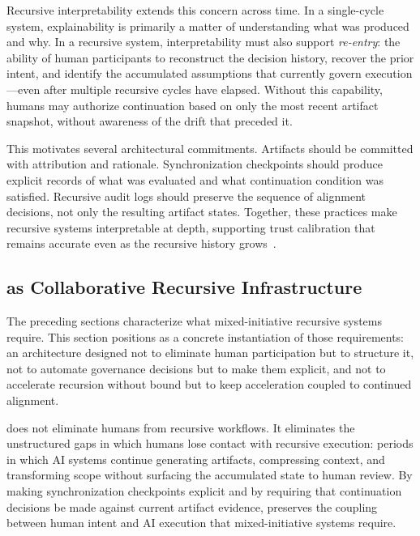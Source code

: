 Recursive interpretability extends this concern across time. In a single-cycle system, explainability is primarily a matter of understanding what was produced and why. In a recursive system, interpretability must also support \textit{re-entry}: the ability of human participants to reconstruct the decision history, recover the prior intent, and identify the accumulated assumptions that currently govern execution---even after multiple recursive cycles have elapsed. Without this capability, humans may authorize continuation based on only the most recent artifact snapshot, without awareness of the drift that preceded it.

This motivates several architectural commitments. Artifacts should be committed with attribution and rationale. Synchronization checkpoints should produce explicit records of what was evaluated and what continuation condition was satisfied. Recursive audit logs should preserve the sequence of alignment decisions, not only the resulting artifact states. Together, these practices make recursive systems interpretable at depth, supporting trust calibration that remains accurate even as the recursive history grows~\cite{Wiener1948Cybernetics,Lamport1978TimeClocks}.

\subsection{ as Collaborative Recursive Infrastructure}

The preceding sections characterize what mixed-initiative recursive systems require. This section positions  as a concrete instantiation of those requirements: an architecture designed not to eliminate human participation but to structure it, not to automate governance decisions but to make them explicit, and not to accelerate recursion without bound but to keep acceleration coupled to continued alignment.

 does not eliminate humans from recursive workflows. It eliminates the unstructured gaps in which humans lose contact with recursive execution: periods in which AI systems continue generating artifacts, compressing context, and transforming scope without surfacing the accumulated state to human review. By making synchronization checkpoints explicit and by requiring that continuation decisions be made against current artifact evidence,  preserves the coupling between human intent and AI execution that mixed-initiative systems require.

